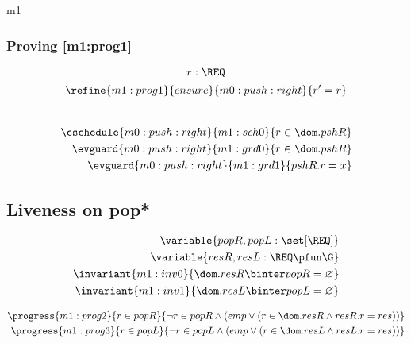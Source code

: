 \documentclass[12pt]{amsart}
\begin{document}
\begin{machine}{m1}
\subsubsection{Proving \ref{m1:prog1}}
\[ \indices{m0:push:right}{ r : \REQ } \]
\begin{align*}
\refine{m1:prog1}{ensure}{m0:push:right}{ \index{r}{r' = r} }
\end{align*}

\begin{align*}
\\ \cschedule{m0:push:right}{m1:sch0}{ r \in \dom.pshR }
\\ \evguard{m0:push:right}{m1:grd0}{ r \in \dom.pshR }
\\ \evguard{m0:push:right}{m1:grd1}{ pshR.r = x }
\end{align*}

\subsection{Liveness on pop*}

\begin{align*}
\variable{ popR, popL : \set [\REQ]}
\\ \variable{ resR, resL : \REQ \pfun \G }
\\ \invariant{m1:inv0}{ \dom.resR \binter popR = \emptyset }
\\ \invariant{m1:inv1}{ \dom.resL \binter popL = \emptyset }
\end{align*}

\begin{align*}
\progress{m1:prog2}{ r \in popR }{ \neg r \in popR \land (emp \lor (r \in \dom.resR \land resR.r = res))  }
\\ \progress{m1:prog3}{ r \in popL }{ \neg r \in popL \land (emp \lor (r \in \dom.resL \land resL.r = res))  }
\end{align*}


\end{machine}
\end{document}
